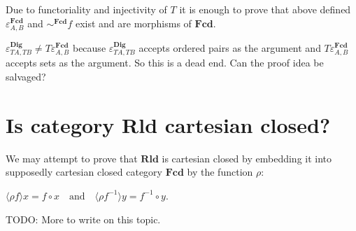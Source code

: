 Due to functoriality and injectivity of $T$ it is enough to prove that above defined $\varepsilon^{\mathbf{Fcd}}_{A, B}$ and $\sim^{\mathbf{Fcd}} f$ exist and are morphisms of $\mathbf{Fcd}$.

$\varepsilon^{\mathbf{Dig}}_{T A, T B} \ne T\varepsilon^{\mathbf{Fcd}}_{A, B}$ because $\varepsilon^{\mathbf{Dig}}_{T A, T B}$ accepts ordered pairs as the argument and $T \varepsilon^{\mathbf{Fcd}}_{A, B}$ accepts sets as the argument. So this is a dead end. Can the proof idea be salvaged?

\section{Is category Rld cartesian closed?}

We may attempt to prove that $\mathbf{Rld}$ is cartesian closed by embedding it into supposedly cartesian closed category $\mathbf{Fcd}$ by the function $\rho$:

$\langle \rho f \rangle x = f \circ x \quad \text{and} \quad \langle \rho f^{- 1} \rangle y = f^{- 1} \circ y$.

TODO: More to write on this topic.
